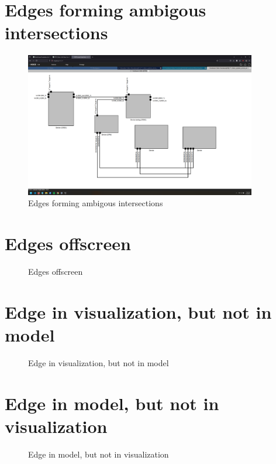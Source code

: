\documentclass{article}
\begin{document}
\section{Edges forming ambigous intersections}
\begin{figure}[H]
    \centering
    \includegraphics[width=0.9\textwidth]{images/edges_forming_ambigous_intersections.png}
    \caption{Edges forming ambigous intersections}
\end{figure}
\newpage

\section{Edges offscreen}
\begin{figure}[H]
    \centering
    \caption{Edges offscreen}
\end{figure}
\newpage

\section{Edge in visualization, but not in model}
\begin{figure}[H]
    \centering
    \caption{Edge in visualization, but not in model}
\end{figure}
\newpage

\section{Edge in model, but not in visualization}
\begin{figure}[H]
    \centering
    \caption{Edge in model, but not in visualization}
\end{figure}
\newpage
\end{document}
